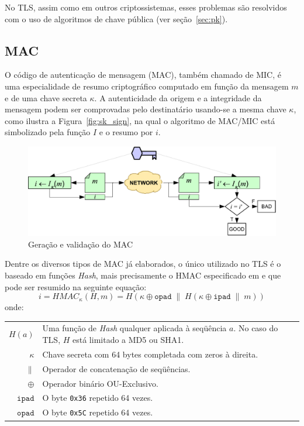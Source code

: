 No TLS, assim como em outros criptossistemas, esses problemas são resolvidos com o uso de
algoritmos de chave pública (ver seção~\ref{sec:pk}).

\subsection{\acl{MAC}}

O código de autenticação de mensagem (\acs{MAC}), também chamado de \ac{MIC},
é uma especialidade de resumo criptográfico computado em função
da mensagem $m$ e de uma chave secreta $\kappa$. A autenticidade da origem e a
integridade da mensagem podem ser comprovadas pelo destinatário usando-se a
mesma chave $\kappa$, como ilustra a Figura~\vref{fig:sk_sign}, na qual o
algoritmo de MAC/MIC está simbolizado pela função $I$ e o resumo por $i$.

\begin{figure}[htbp]
	\centering
		\includegraphics[scale=0.7]{fig/sk_sign}
	\caption{Geração e validação do MAC}
	\label{fig:sk_sign}
\end{figure}

Dentre os diversos tipos de \acs{MAC} já elaborados, o único
utilizado no TLS é o baseado em funções \emph{Hash}, mais precisamente o \ac{HMAC}
especificado em \cite{rfc_hmac} e que pode ser resumido na seguinte equação:
\[ i = HMAC_\kappa(H,m) = H(\kappa \oplus \mathtt{opad} \;\|\; H(\kappa \oplus \mathtt{ipad} \;\|\; m)) \]
onde:

\begin{tabular}{@{}rp{13cm}@{}}
$H(a)$		& Uma função de \emph{Hash} qualquer aplicada à seqüência $a$.
		  		  No caso do TLS, $H$ está limitado a \acs{MD5} ou \acs{SHA1}. \\
\addlinespace
$\kappa$	& Chave secreta com 64 bytes completada com zeros à direita. \\
\addlinespace
$\|$		& Operador de concatenação de seqüências. \\
\addlinespace
$\oplus$	& Operador binário OU-Exclusivo. \\
\addlinespace
$\mathtt{ipad}$ & O byte \texttt{0x36} repetido 64 vezes. \\
\addlinespace
$\mathtt{opad}$ & O byte \texttt{0x5C} repetido 64 vezes. \\
\end{tabular}

